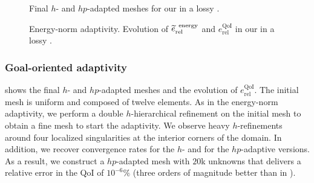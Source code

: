 \pagebreak

\begin{figure}
  \caption{Final $h$- and $hp$-adapted meshes for our  in a lossy .}
  \label{fig:Helm2DGOANonmesh}
\end{figure}

\pagebreak

\begin{figure}
  \caption{Energy-norm adaptivity. Evolution of $\tilde{e}_{\textrm{rel}}^{\textrm{\, energy}}$ and $e_{\textrm{rel}}^{\textrm{QoI}}$ in our  in a lossy .}
  \label{fig:ErrorQoIenergy}
\end{figure}

\pagebreak

\subsubsection{Goal-oriented adaptivity}

 shows the final $h$- and $hp$-adapted meshes and the evolution of $e_{\textrm{rel}}^{\textrm{QoI}}$. The initial mesh is uniform and composed of twelve  elements. As in the energy-norm adaptivity, we perform a double $h$-hierarchical refinement on the initial mesh to obtain a fine mesh to start the adaptivity. We observe heavy $h$-refinements around four localized singularities at the interior corners of the domain. In addition, we recover  convergence rates for the $h$- and for the $hp$-adaptive versions. As a result, we construct a $hp$-adapted mesh with $20$k unknowns that delivers a relative error in the QoI of $10^{-6} \%$ (three orders of magnitude better than in ).

